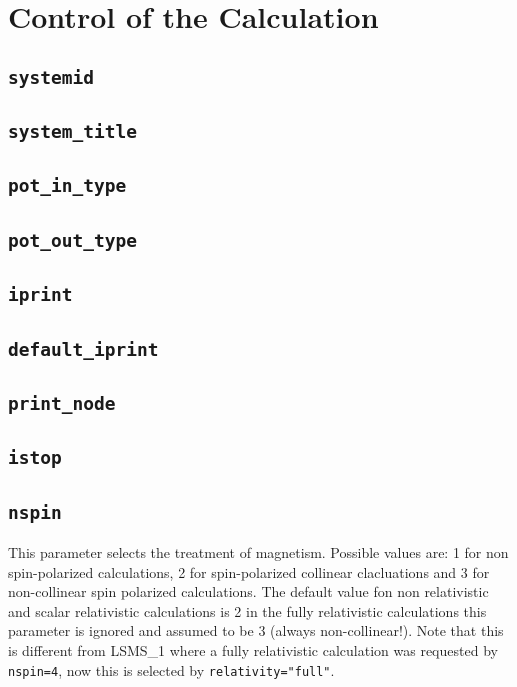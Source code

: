 \section{Control of the Calculation}

\subsection{\texttt{systemid}}

\subsection{\texttt{system\_title}}

\subsection{\texttt{pot\_in\_type}}

\subsection{\texttt{pot\_out\_type}}

\subsection{\texttt{iprint}}

\subsection{\texttt{default\_iprint}}

\subsection{\texttt{print\_node}}

\subsection{\texttt{istop}}

\subsection{\texttt{nspin}}
This parameter selects the treatment of magnetism. Possible values are: 1 for non spin-polarized calculations,
2 for spin-polarized collinear clacluations and 3 for non-collinear spin polarized calculations.
The default value fon non relativistic and scalar relativistic calculations is 2 in the fully relativistic
calculations this parameter is ignored and assumed to be 3 (always non-collinear!). Note that this is different from LSMS\_1
where a fully relativistic calculation was requested by \texttt{nspin=4}, now this is selected by \texttt{relativity="full"}.

